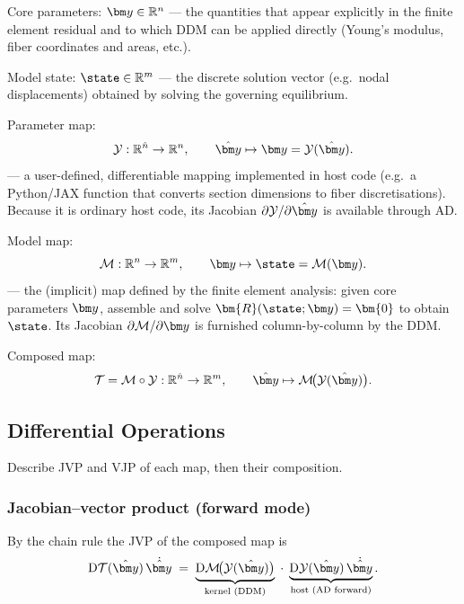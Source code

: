   Core parameters:   $\corey \in \mathbb{R}^{\ncore}$
      — the quantities that appear explicitly in the finite element
        residual and to which DDM can be applied directly
        (Young's modulus, fiber coordinates and areas, etc.).

  Model state:        $\state \in \mathbb{R}^{\nstate}$
      — the discrete solution vector (e.g.\ nodal displacements)
        obtained by solving the governing equilibrium.

  Parameter map:
  \[
      \Ymap : \mathbb{R}^{\nhost} \to \mathbb{R}^{\ncore},
      \qquad \haty \mapsto \corey = \Ymap(\haty).
  \]
      — a user-defined, differentiable mapping implemented in host
        code (e.g.\ a Python/JAX function that converts section
        dimensions to fiber discretisations).  Because it is
        ordinary host code, its Jacobian
        $\partial\Ymap/\partial\haty$ is available through AD.

  Model map:
  \[
      \Mmap : \mathbb{R}^{\ncore} \to \mathbb{R}^{\nstate},
      \qquad \corey \mapsto \state = \Mmap(\corey).
  \]
      — the (implicit) map defined by the finite element analysis:
        given core parameters $\corey$, assemble and solve
        $\bm{R}(\state;\corey) = \bm{0}$ to obtain $\state$.
        Its Jacobian $\partial\Mmap/\partial\corey$ is furnished
        column-by-column by the DDM.

  Composed map:
  \[
      \Tmap = \Mmap \circ \Ymap :
      \mathbb{R}^{\nhost} \to \mathbb{R}^{\nstate},
      \qquad \haty \mapsto \Mmap\!\bigl(\Ymap(\haty)\bigr).
  \]

\subsection{Differential Operations}
Describe JVP and VJP of each map, then their composition.

\subsubsection{Jacobian--vector product (forward mode)}

  By the chain rule the JVP of the composed map is
  \[
      \mathrm{D}\Tmap(\haty)\,\dot{\haty}
      \;=\;
      \underbrace{%
          \mathrm{D}\Mmap\!\bigl(\Ymap(\haty)\bigr)
      }_{\text{kernel (DDM)}}
      \;\cdot\;
      \underbrace{%
          \mathrm{D}\Ymap(\haty)\,\dot{\haty}
      }_{\text{host (AD forward)}}.
  \]


